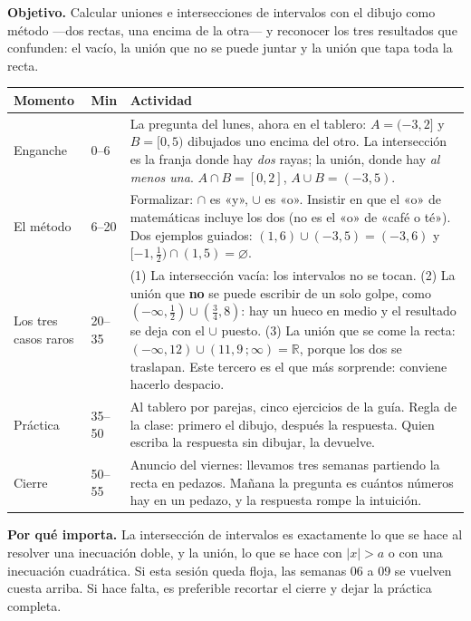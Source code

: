 \documentclass[11pt]{article}
\begin{document}

\textbf{Objetivo.} Calcular uniones e intersecciones de intervalos con el dibujo como método
—dos rectas, una encima de la otra— y reconocer los tres resultados que confunden: el vacío,
la unión que no se puede juntar y la unión que tapa toda la recta.

\begin{center}
{\renewcommand{\arraystretch}{1.3}
\begin{tabularx}{\linewidth}{@{}l l X@{}}
  \toprule
  \textbf{Momento} & \textbf{Min} & \textbf{Actividad}\\
  \midrule
  Enganche & 0--6 & La pregunta del lunes, ahora en el tablero: $A = (-3, 2]$ y $B = [0, 5)$
    dibujados uno encima del otro. La intersección es la franja donde hay \emph{dos} rayas;
    la unión, donde hay \emph{al menos una}. $A \cap B = [0, 2]$, $A \cup B = (-3, 5)$.\\
  El método & 6--20 & Formalizar: $\cap$ es «y», $\cup$ es «o». Insistir en que el «o» de
    matemáticas incluye los dos (no es el «o» de «café o té»). Dos ejemplos guiados:
    $(1,6) \cup (-3,5) = (-3,6)$ y $[-1, \frac{1}{2}) \cap (1,5) = \varnothing$.\\
  Los tres casos raros & 20--35 & (1) La intersección vacía: los intervalos no se tocan. (2) La
    unión que \textbf{no} se puede escribir de un solo golpe, como
    $(-\infty, \frac{1}{2}) \cup (\frac{3}{4}, 8)$: hay un hueco en medio y el resultado se
    deja con el $\cup$ puesto. (3) La unión que se come la recta:
    $(-\infty, 12) \cup (11{,}9\,; \infty) = \mathbb{R}$, porque los dos se traslapan. Este
    tercero es el que más sorprende: conviene hacerlo despacio.\\
  Práctica & 35--50 & Al tablero por parejas, cinco ejercicios de la guía. Regla de la clase:
    primero el dibujo, después la respuesta. Quien escriba la respuesta sin dibujar, la
    devuelve.\\
  Cierre & 50--55 & Anuncio del viernes: llevamos tres semanas partiendo la recta en pedazos.
    Mañana la pregunta es cuántos números hay en un pedazo, y la respuesta rompe la intuición.\\
  \bottomrule
\end{tabularx}}
\end{center}

\begin{nota}
\textbf{Por qué importa.} La intersección de intervalos es exactamente lo que se hace al
resolver una inecuación doble, y la unión, lo que se hace con $|x| > a$ o con una inecuación
cuadrática. Si esta sesión queda floja, las semanas 06 a 09 se vuelven cuesta arriba. Si hace
falta, es preferible recortar el cierre y dejar la práctica completa.
\end{nota}
\end{document}
